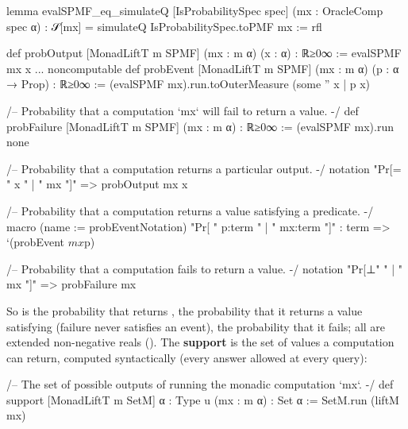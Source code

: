 

\begin{leancode}
lemma evalSPMF_eq_simulateQ [IsProbabilitySpec spec] (mx : OracleComp spec α) :
    𝒮[mx] = simulateQ IsProbabilitySpec.toPMF mx := rfl
\end{leancode}



\begin{leancode}
def probOutput [MonadLiftT m SPMF] (mx : m α) (x : α) : ℝ≥0∞ :=
  evalSPMF mx x
...
noncomputable def probEvent [MonadLiftT m SPMF] (mx : m α) (p : α → Prop) : ℝ≥0∞ :=
  (evalSPMF mx).run.toOuterMeasure (some '' {x | p x})

/-- Probability that a computation `mx` will fail to return a value. -/
def probFailure [MonadLiftT m SPMF] (mx : m α) : ℝ≥0∞ :=
  (evalSPMF mx).run none

/-- Probability that a computation returns a particular output. -/
notation "Pr[= " x " | " mx "]" => probOutput mx x

/-- Probability that a computation returns a value satisfying a predicate. -/
macro (name := probEventNotation) "Pr[ " p:term " | " mx:term "]" : term =>
  `(probEvent $mx $p)

/-- Probability that a computation fails to return a value. -/
notation "Pr[⊥" " | " mx "]" => probFailure mx
\end{leancode}


So  is the probability that  returns , 
the probability that it returns a value satisfying  (failure never satisfies an event),
 the probability that it fails; all are extended non-negative reals
(). The \textbf{support} is the set of values a computation can return, computed
syntactically (every answer allowed at every query):

\begin{leancode}
/-- The set of possible outputs of running the monadic computation `mx`. -/
def support [MonadLiftT m SetM] {α : Type u} (mx : m α) : Set α :=
  SetM.run (liftM mx)
\end{leancode}


